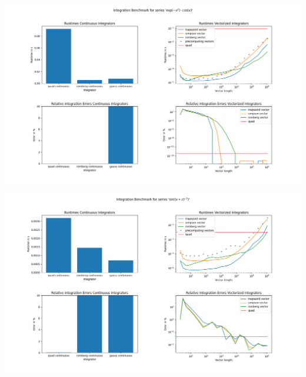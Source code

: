 
\begin{frame}
%
\begin{center}
\includegraphics[width=\linewidth]{./gfx/03-timedints-1}
\end{center}
%
\end{frame}



\begin{frame}
%
\begin{center}
\includegraphics[width=\linewidth]{./gfx/03-timedints-2}
\end{center}
%
\end{frame}



